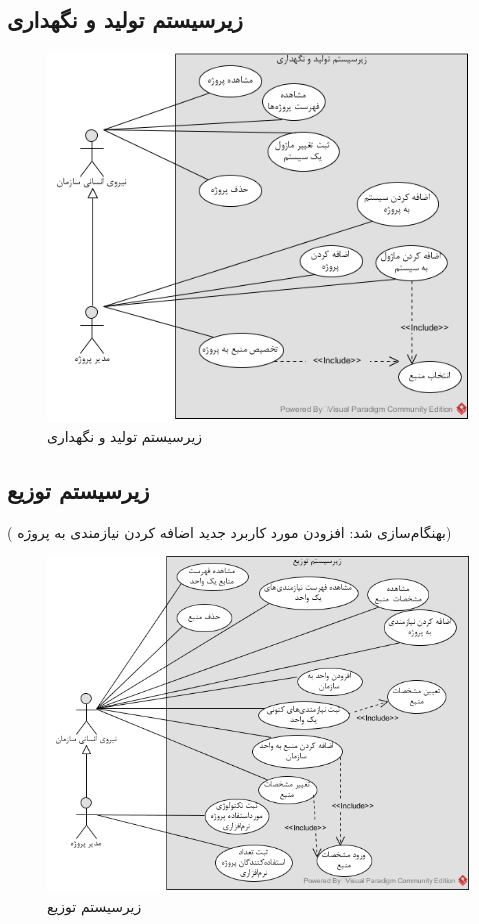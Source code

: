 \subsection{زیرسیستم تولید و نگهداری}
\begin{figure}[H]
	\centering
	\includegraphics[scale=0.8]{img/usecase/tolid}
	\caption{زیرسیستم تولید و نگهداری}
\end{figure}

\newpage
\subsection{زیرسیستم توزیع}
({\color{red} بهنگام‌سازی شد: افزودن مورد کاربرد جدید \- اضافه کردن نیازمندی به پروژه})
\begin{figure}[H]
	\centering
	\includegraphics[scale=0.8]{img/usecase/tozi}
	\caption{زیرسیستم توزیع}
\end{figure}

